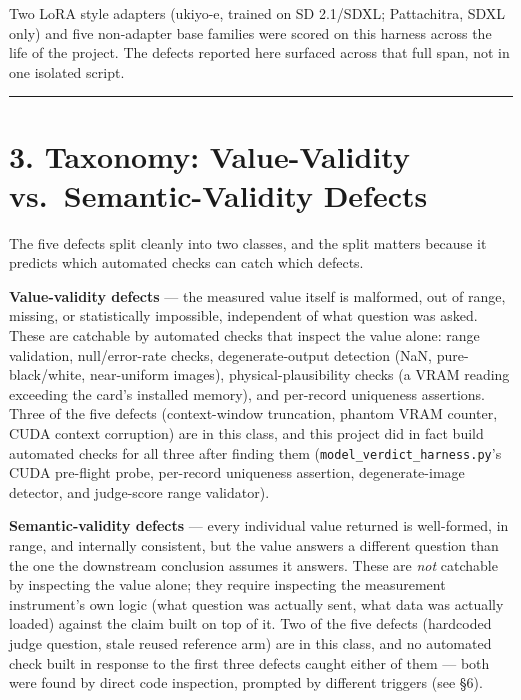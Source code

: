 Two LoRA style adapters (ukiyo-e, trained on SD 2.1/SDXL; Pattachitra,
SDXL only) and five non-adapter base families were scored on this
harness across the life of the project. The defects reported here
surfaced across that full span, not in one isolated script.

\begin{center}\rule{0.5\linewidth}{0.5pt}\end{center}

\hypertarget{taxonomy-value-validity-vs.-semantic-validity-defects}{%
\section{3. Taxonomy: Value-Validity vs.~Semantic-Validity
Defects}\label{taxonomy-value-validity-vs.-semantic-validity-defects}}

The five defects split cleanly into two classes, and the split matters
because it predicts which automated checks can catch which defects.

\textbf{Value-validity defects} --- the measured value itself is
malformed, out of range, missing, or statistically impossible,
independent of what question was asked. These are catchable by automated
checks that inspect the value alone: range validation, null/error-rate
checks, degenerate-output detection (NaN, pure-black/white, near-uniform
images), physical-plausibility checks (a VRAM reading exceeding the
card's installed memory), and per-record uniqueness assertions. Three of
the five defects (context-window truncation, phantom VRAM counter, CUDA
context corruption) are in this class, and this project did in fact
build automated checks for all three after finding them
(\texttt{model\_verdict\_harness.py}'s CUDA pre-flight probe, per-record
uniqueness assertion, degenerate-image detector, and judge-score range
validator).

\textbf{Semantic-validity defects} --- every individual value returned
is well-formed, in range, and internally consistent, but the value
answers a different question than the one the downstream conclusion
assumes it answers. These are \emph{not} catchable by inspecting the
value alone; they require inspecting the measurement instrument's own
logic (what question was actually sent, what data was actually loaded)
against the claim built on top of it. Two of the five defects (hardcoded
judge question, stale reused reference arm) are in this class, and no
automated check built in response to the first three defects caught
either of them --- both were found by direct code inspection, prompted
by different triggers (see §6).

